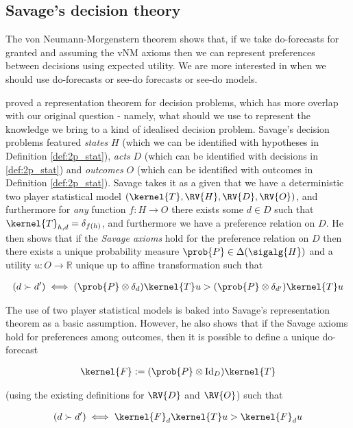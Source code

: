 \subsection{Savage's decision theory}

The von Neumann-Morgenstern theorem shows that, if we take do-forecasts for granted and assuming the vNM axioms then we can represent preferences between decisions using expected utility. We are more interested in when we should use do-forecasts or see-do forecasts or see-do models. 

\citet{savage_foundations_1954} proved a representation theorem for decision problems, which has more overlap with our original question - namely, what should we use to represent the knowledge we bring to a kind of idealised decision problem. Savage's decision problems featured \emph{states} $H$ (which we can be identified with hypotheses in Definition \ref{def:2p_stat}), \emph{acts} $D$ (which can be identified with decisions in \ref{def:2p_stat}) and \emph{outcomes} $O$ (which can be identified with outcomes in Definition \ref{def:2p_stat}). Savage takes it as a given that we have a deterministic two player statistical model $(\kernel{T},\RV{H},\RV{D},\RV{O})$, and furthermore for \emph{any} function $f:H\to O$ there exists some $d\in D$ such that $\kernel{T}_{h,d} = \delta_{f(h)}$, and furthermore we have a preference relation on $D$. He then shows that if the \emph{Savage axioms} hold for the preference relation on $D$ then there exists a unique probability measure $\prob{P}\in \Delta(\sigalg{H})$ and a utility $u:O\to \mathbb{R}$ unique up to affine transformation such that

\begin{align}
(d\succ d')\iff (\prob{P}\otimes \delta_d)\kernel{T} u > (\prob{P}\otimes \delta_{d'})\kernel{T} u\label{eq:savage_utility}
\end{align}

The use of two player statistical models is baked into Savage's representation theorem as a basic assumption. However, he also shows that if the Savage axioms hold for preferences among outcomes, then it is possible to define a unique do-forecast

\begin{align}
    \kernel{F}:=(\prob{P}\otimes \mathrm{Id}_D)\kernel{T}
\end{align}

(using the existing definitions for $\RV{D}$ and $\RV{O}$) such that

\begin{align}
    (d\succ d')\iff \kernel{F}_d\kernel{T} u > \kernel{F}_d u\label{eq:savage_utility2}
\end{align}

